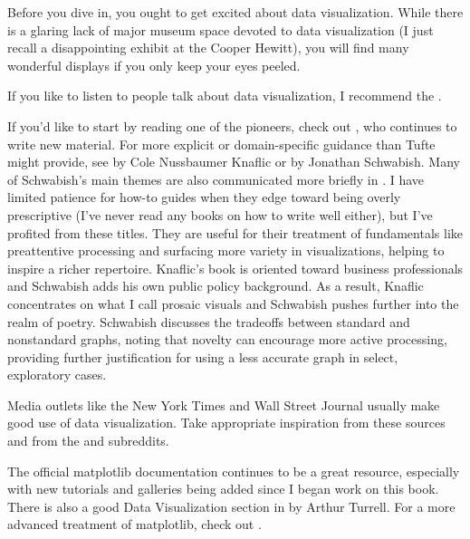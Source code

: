 Before you dive in, you ought to get excited about data visualization. While there is a glaring lack of major museum space devoted to data visualization (I just recall a disappointing exhibit at the Cooper Hewitt), you will find many wonderful displays if you only keep your eyes peeled. 
 
If you like to listen to people talk about data visualization, I recommend the . 

If you'd like to start by reading one of the pioneers, check out , who continues to write new material. For more explicit or domain-specific guidance than Tufte might provide, see  by Cole Nussbaumer Knaflic or  by Jonathan Schwabish. Many of Schwabish's main themes are also communicated more briefly in \cite{schwabish2014economist}. I have limited patience for how-to guides when they edge toward being overly prescriptive (I've never read any books on how to write well either), but I've profited from these titles. They are useful for their treatment of fundamentals like preattentive processing and surfacing more variety in visualizations, helping to inspire a richer repertoire. Knaflic's book is oriented toward business professionals and Schwabish adds his own public policy background. As a result, Knaflic concentrates on what I call prosaic visuals  and Schwabish pushes further into the realm of poetry. Schwabish discusses the tradeoffs between standard and nonstandard graphs, noting that novelty can encourage more active processing, providing further justification for using a less accurate graph in select, exploratory cases.

Media outlets like the New York Times and Wall Street Journal usually make good use of data visualization. Take appropriate inspiration from these sources and from the  and  subreddits.

The official matplotlib documentation continues to be a great resource, especially with new tutorials and galleries being added since I began work on this book. There is also a good Data Visualization section in  by Arthur Turrell. For a more advanced treatment of matplotlib, check out .
